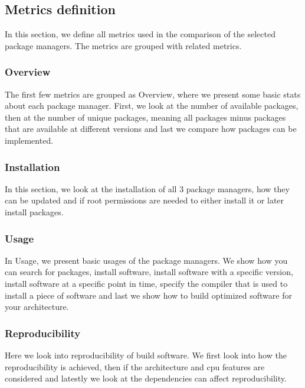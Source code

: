 \documentclass[conference,final,a4paper]{IEEEtran}
\begin{document}
\subsection{Metrics definition}

In this section, we define all metrics used in the comparison of the selected package managers.
The metrics are grouped with related metrics.\\

\subsubsection{Overview}
The first few metrics are grouped as Overview, where we present some basic stats about each package manager.
First, we look at the number of available packages, then at the number of unique packages, meaning all packages minus packages that are available at different versions and last we compare how packages can be implemented.\\

\subsubsection{Installation}
In this section, we look at the installation of all 3 package managers, how they can be updated and if root permissions are needed to either install it or later install packages.\\

\subsubsection{Usage}
In Usage, we present basic usages of the package managers.
We show how you can search for packages, install software, install software with a specific version, install software at a specific point in time, specify the compiler that is used to install a piece of software and last we show how to build optimized software for your architecture.\\

\subsubsection{Reproducibility}
Here we look into reproducibility of build software.
We first look into how the reproducibility is achieved, then if the architecture and cpu features are considered and latestly we look at the dependencies can affect reproducibility.\\
\end{document}
